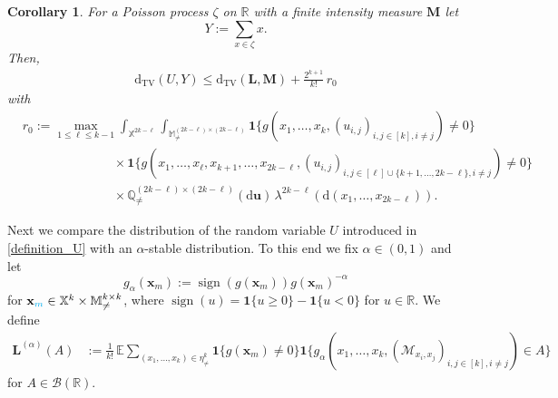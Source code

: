 \documentclass{article}
\newtheorem{cor}[theorem]{Corollary}
\theoremstyle{definition}
\numberwithin{equation}{section}
\theoremstyle{remark}
\begin{document}
\begin{cor}\label{compound}
For a Poisson process  \( \zeta \) on \( \mathbb{R} \) with a finite intensity measure \( \mathbf{M} \) let
\[
Y := \sum_{x \in \zeta} x.
\]
Then,
\begin{align*}
\mathrm{d}_{\mathrm{TV}}(U, Y) \le \mathrm{d}_{\mathrm{TV}}(\mathbf{L}, \mathbf{M}) + \frac{2^{k+1}}{k!} \, r_0
\end{align*}
with
\begin{align*}
  &  r_0 := \max_{1 \leq \ell \leq k-1} 
\int_{\mathbb{X}^{2k-\ell}} \int_{\mathbb{M}^{(2k-\ell)\times (2k-\ell)}_{\neq}}  
\mathbf{1}\big\{ g({x}_1, \ldots, {x}_k , (u_{i,j})_{i,j\in[k],i\neq j} )\neq 0 \big\}  \\
&  \hspace{3cm} \times \mathbf{1}\big\{ g({x}_1, \ldots, {x}_\ell, {x}_{k+1}, \ldots, {x}_{2k-\ell}, (u_{i,j})_{i,j\in [\ell]\cup\{k+1,\ldots,2k-\ell\}, i\neq j} ) \neq 0 \big\} \\
& \hspace{3cm} \times  \mathbb{Q}^{(2k-\ell)\times(2k-\ell)}_{\neq} (\mathrm{d}\mathbf{u}) \, \lambda^{2k-\ell}(\mathrm{d}(x_1,\ldots,x_{2k-\ell})).
\end{align*}
\end{cor}


\iffalse
Next we compare the distribution of the random variable $U$ introduced in \eqref{definition_U} with an $\alpha$-stable distribution. To this end we fix $\alpha\in(0,1)$ and let
$$
g_\alpha (\mathbf{x}_m) :=  \operatorname{sign}(g(\mathbf{x}_m)) g(\mathbf{x}_m)^{-\alpha}
$$
for $\mathbf{x}_{\textcolor{cyan}{m}}\in \mathbb{X}^k\times\mathbb{M}^{k\times k}_{\neq}$, where $\operatorname{sign}(u) = \mathbf{1}\{u \ge 0\} - \mathbf{1}\{u < 0\}$ for $u\in\mathbb{R}$.
We define
\begin{align*}
	\mathbf{L}^{(\alpha)}(A) & := \frac{1}{k!} \, \mathbb{E} \sum_{(x_1, \ldots, x_k) \in \eta_{\neq}^k} \mathbf{1}\{ g(\mathbf{x}_m)\neq 0 \}  \mathbf{1}\{ g_\alpha(x_1, \ldots, x_k, (\mathcal{M}_{x_i,x_j})_{i,j\in[k], i \neq j})\in A \}
\end{align*}
for $A \in \mathcal{B}(\mathbb{R})$.
\end{document}
